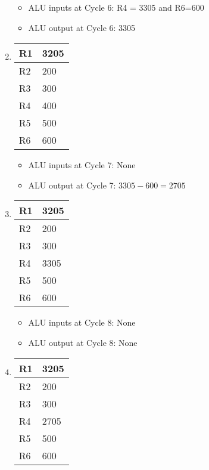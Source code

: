 \documentclass[12pt,letterpaper]{hmcpset}
\begin{document}
\begin{solution}
\begin{enumerate}[label=Cycle \arabic*]
\begin{itemize}
\item ALU inputs at Cycle 6: R4 = 3305 and R6=600
\item ALU output at Cycle 6: 3305
\end{itemize}

\item

\begin{tabular}{|l|l|}
\hline
R1 & 3205 \\
\hline 
R2 & 200 \\
\hline
R3 & 300 \\
\hline
R4 & 400 \\
\hline
R5 & 500 \\
\hline
R6 & 600 \\
\hline
\end{tabular}

\begin{itemize}
\item ALU inputs at Cycle 7: None
\item ALU output at Cycle 7: $3305-600=2705$
\end{itemize}

\item

\begin{tabular}{|l|l|}
\hline
R1 & 3205 \\
\hline 
R2 & 200 \\
\hline
R3 & 300 \\
\hline
R4 & 3305 \\
\hline
R5 & 500 \\
\hline
R6 & 600 \\
\hline
\end{tabular}

\begin{itemize}
\item ALU inputs at Cycle 8: None
\item ALU output at Cycle 8: None
\end{itemize}

\item

\begin{tabular}{|l|l|}
\hline
R1 & 3205 \\
\hline 
R2 & 200 \\
\hline
R3 & 300 \\
\hline
R4 & 2705 \\
\hline
R5 & 500 \\
\hline
R6 & 600 \\
\hline
\end{tabular}


\end{enumerate}
\end{solution}
\end{document}
